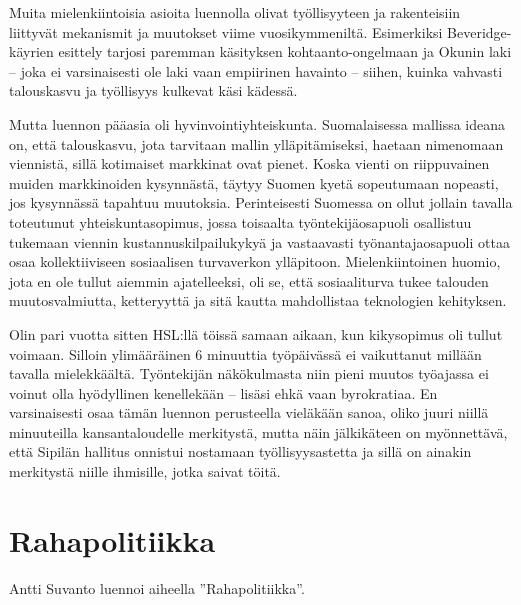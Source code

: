 \documentclass[12pt]{article}
\begin{document}
Muita mielenkiintoisia asioita luennolla olivat työllisyyteen ja rakenteisiin liittyvät mekanismit ja muutokset viime vuosikymmeniltä. Esimerkiksi Beveridge-käyrien esittely tarjosi paremman käsityksen kohtaanto-ongelmaan ja Okunin laki -- joka ei varsinaisesti ole laki vaan empiirinen havainto -- siihen, kuinka vahvasti talouskasvu ja työllisyys kulkevat käsi kädessä.

Mutta luennon pääasia oli hyvinvointiyhteiskunta. Suomalaisessa mallissa ideana on, että talouskasvu, jota tarvitaan mallin ylläpitämiseksi, haetaan nimenomaan viennistä, sillä kotimaiset markkinat ovat pienet. Koska vienti on riippuvainen muiden markkinoiden kysynnästä, täytyy Suomen kyetä sopeutumaan nopeasti, jos kysynnässä tapahtuu muutoksia. Perinteisesti Suomessa on ollut jollain tavalla toteutunut yhteiskuntasopimus, jossa toisaalta työntekijäosapuoli osallistuu tukemaan viennin kustannuskilpailukykyä ja vastaavasti työnantajaosapuoli ottaa osaa kollektiiviseen sosiaalisen turvaverkon ylläpitoon. Mielenkiintoinen huomio, jota en ole tullut aiemmin ajatelleeksi, oli se, että sosiaaliturva tukee talouden muutosvalmiutta, ketteryyttä ja sitä kautta mahdollistaa teknologien kehityksen.

Olin pari vuotta sitten HSL:llä töissä samaan aikaan, kun kikysopimus oli tullut voimaan. Silloin ylimääräinen 6 minuuttia työpäivässä ei vaikuttanut millään tavalla mielekkäältä. Työntekijän näkökulmasta niin pieni muutos työajassa ei voinut olla hyödyllinen kenellekään -- lisäsi ehkä vaan byrokratiaa. En varsinaisesti osaa tämän luennon perusteella vieläkään sanoa, oliko juuri niillä minuuteilla kansantaloudelle merkitystä, mutta näin jälkikäteen on myönnettävä, että Sipilän hallitus onnistui nostamaan työllisyysastetta ja sillä on ainakin merkitystä niille ihmisille, jotka saivat töitä.

\newpage
\section{Rahapolitiikka}

Antti Suvanto luennoi aiheella ''Rahapolitiikka''.
\end{document}
